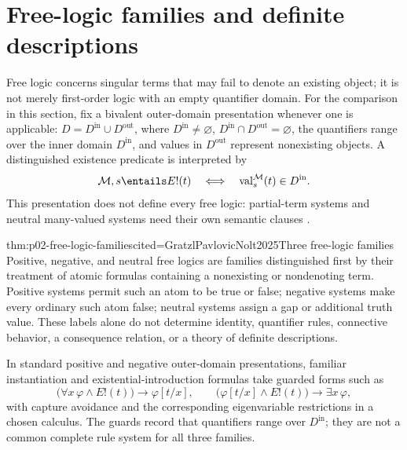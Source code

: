 \section{Free-logic families and definite descriptions}
\label{sec:p02-free-logic}

Free logic concerns singular terms that may fail to denote an existing object;
it is not merely first-order logic with an empty quantifier domain.  For the
comparison in this section, fix a bivalent outer-domain presentation whenever
one is applicable: \(D=D^{\mathrm{in}}\cup D^{\mathrm{out}}\), where
\(D^{\mathrm{in}}\ne\varnothing\),
\(D^{\mathrm{in}}\cap D^{\mathrm{out}}=\varnothing\), the quantifiers range
over the inner domain \(D^{\mathrm{in}}\), and values in
\(D^{\mathrm{out}}\) represent nonexisting objects.  A distinguished
existence predicate is interpreted by
\[
 \mathcal M,s\entails E!(t)
 \quad\Longleftrightarrow\quad
 \operatorname{val}^{\mathcal M}_{s}(t)\in D^{\mathrm{in}}.
\]
This presentation does not define every free logic: partial-term systems and
neutral many-valued systems need their own semantic clauses
\cite{GratzlPavlovicNolt2025}.

\begin{hbtheorem}{thm:p02-free-logic-families}{cited=GratzlPavlovicNolt2025}{Three free-logic families}
Positive, negative, and neutral free logics are families distinguished first
by their treatment of atomic formulas containing a nonexisting or nondenoting
term.  Positive systems permit such an atom to be true or false; negative
systems make every ordinary such atom false; neutral systems assign a gap or
additional truth value.  These labels alone do not determine identity,
quantifier rules, connective behavior, a consequence relation, or a theory of
definite descriptions.
\end{hbtheorem}

In standard positive and negative outer-domain presentations, familiar
instantiation and existential-introduction formulas take guarded forms such as
\[
 \bigl(\forall x\,\varphi\land E!(t)\bigr)\to\varphi[t/x],
 \qquad
 \bigl(\varphi[t/x]\land E!(t)\bigr)\to\exists x\,\varphi,
\]
with capture avoidance and the corresponding eigenvariable restrictions in a
chosen calculus.  The guards record that quantifiers range over
\(D^{\mathrm{in}}\); they are not a common complete rule system for all three
families.

